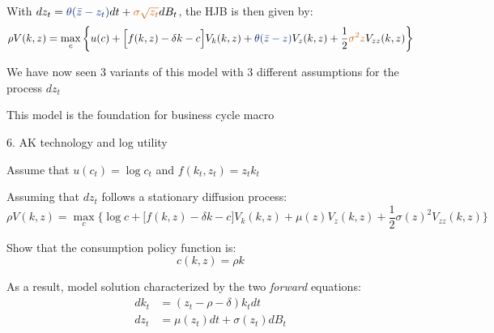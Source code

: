 \documentclass[11pt, aspectratio=169]{beamer}
\newenvironment{witemize}{\itemize\addtolength{\itemsep}{10pt}}{\enditemize}
\begin{document}
\begin{frame}{}
\begin{witemize}
\item With $dz_t = {\color{blue} \theta(\bar z - z_t) } dt + {\color{red} \sigma \sqrt{z_t} } dB_t$, the HJB is then given by:
\begin{equation*}
	\rho V(k, z) = \max_c \bigg\{ u(c) + \Big[ f(k, z) - \delta k - c \Big] V_k(k, z) + {\color{blue} \theta(\bar z - z) } V_z(k, z) + \frac{1}{2} {\color{red} \sigma^2 z } V_{zz}(k, z) \bigg\}
\end{equation*}

\item We have now seen 3 variants of this model with 3 different assumptions for the process $dz_t$

\item This model is the foundation for business cycle macro 
\end{witemize}
\end{frame}


\begin{frame}{6. AK technology and log utility}
\begin{witemize}
\item Assume that $u(c_t) = \log c_t$ and $f(k_t, z_t) = z_t k_t$

\item Assuming that $dz_t$ follows a stationary diffusion process:
\begin{equation*}
	\rho V(k, z) = \max_c \bigg\{ \log c + \Big[ f(k, z) - \delta k - c \Big] V_k(k, z) + \mu(z) V_z(k, z) + \frac{1}{2} \sigma(z)^2 V_{zz}(k, z) \bigg\}
\end{equation*}

\item Show that the consumption policy function is:
\begin{equation*}
	c(k, z) = \rho k
\end{equation*}

\item As a result, model solution characterized by the two \textit{forward} equations:
\begin{align*}
	dk_t &= (z_t - \rho - \delta) k_t dt \\
	dz_t &= \mu(z_t) dt + \sigma(z_t) dB_t
\end{align*}

\end{witemize}
\end{frame}
\end{document}

